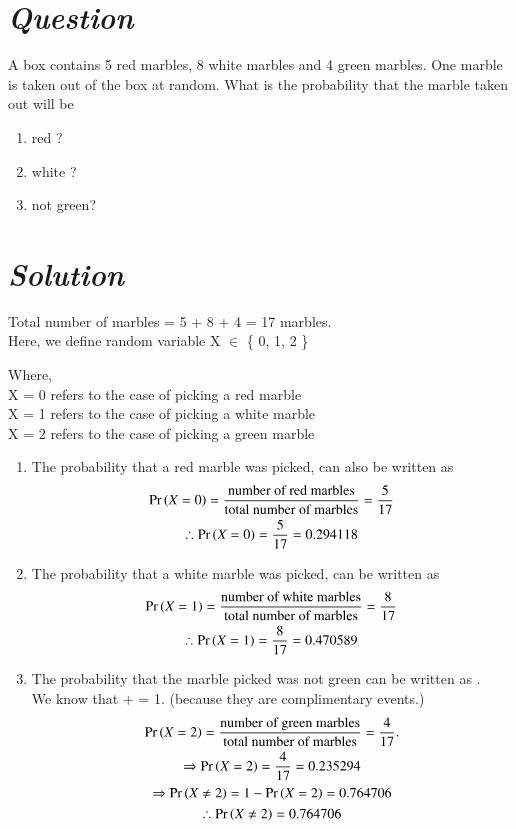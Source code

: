 \documentclass[journal,12pt,twocolumn]{IEEEtran}
\begin{document}
\section * {\emph{Question}}
A box contains 5 red marbles, 8 white marbles and 4 green marbles. One marble is taken out of the box at random. What is the probability that the marble taken out will be
\begin{enumerate}
    \item red ?
    \item white ?
    \item not green?
\end{enumerate} 
\section*{\emph{Solution}}
Total number of marbles = 5 + 8 + 4 = 17 marbles. 
\\Here, we define random variable X $\in$ \{ 0, 1, 2 \}

Where,
\\X = 0 refers to the case of picking a red marble
\\X = 1 refers to the case of picking a white marble
\\X = 2 refers to the case of picking a green marble
   
\begin{enumerate}
    \item The probability that a red marble was picked, can also be written as 
    \begin{multline*}
        \Pr\left(X=0\right) = \frac{\mbox{number of red marbles}}{\mbox{total number of marbles}} = \frac{5}{17}
        \\\therefore  \Pr\left(X=0\right) = \frac{5}{17} = 0.294118
    \end{multline*}
    \item The probability that a white marble was picked, can be written as 
    \begin{multline*}
        \Pr\left(X=1\right) = \frac{\mbox{number of white marbles}}{\mbox{total number of marbles}}
        = \frac{8}{17} 
        \\\therefore  \Pr\left(X=1\right) = \frac{8}{17} = 0.470589
    \end{multline*}
    \item The probability that the marble picked was not green can be written as
    . \\We know that  +  = 1. 
     (because they are complimentary events.)
    \begin{multline*}
     \Pr\left(X=2\right) = \frac{\mbox{number of green marbles}}{\mbox{total number of marbles}}
     = \frac{4}{17}.
     \\\Rightarrow\Pr\left(X=2\right) = \frac{4}{17} = 0.235294
     \\\Rightarrow\Pr\left(X \ne 2\right) = 1 - \Pr\left(X=2\right) = 0.764706
     \\\therefore \Pr\left(X\ne2\right) = 0.764706
    \end{multline*}
\end{enumerate}
\end{document}
